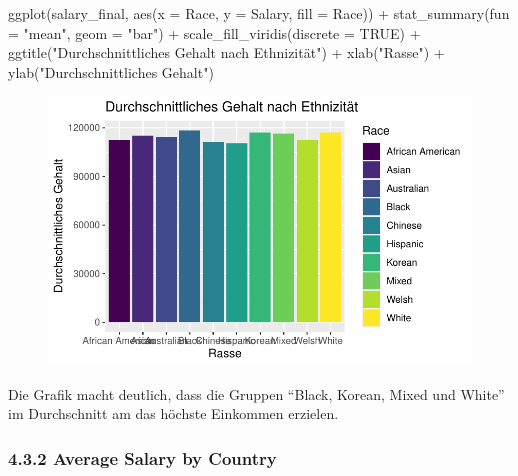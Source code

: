 \documentclass[
  letterpaper,
  DIV=11,
  numbers=noendperiod]{scrartcl}
\newenvironment{Shaded}{\begin{snugshade}}{\end{snugshade}}
\newcommand{\AttributeTok}[1]{\textcolor[rgb]{0.40,0.45,0.13}{#1}}
\newcommand{\ConstantTok}[1]{\textcolor[rgb]{0.56,0.35,0.01}{#1}}
\newcommand{\FunctionTok}[1]{\textcolor[rgb]{0.28,0.35,0.67}{#1}}
\newcommand{\NormalTok}[1]{\textcolor[rgb]{0.00,0.23,0.31}{#1}}
\newcommand{\SpecialCharTok}[1]{\textcolor[rgb]{0.37,0.37,0.37}{#1}}
\newcommand{\StringTok}[1]{\textcolor[rgb]{0.13,0.47,0.30}{#1}}
\begin{document}
\begin{Shaded}
\begin{Highlighting}[]
\FunctionTok{ggplot}\NormalTok{(salary\_final, }\FunctionTok{aes}\NormalTok{(}\AttributeTok{x =}\NormalTok{ Race, }\AttributeTok{y =}\NormalTok{ Salary, }\AttributeTok{fill =}\NormalTok{ Race)) }\SpecialCharTok{+}
  \FunctionTok{stat\_summary}\NormalTok{(}\AttributeTok{fun =} \StringTok{"mean"}\NormalTok{, }\AttributeTok{geom =} \StringTok{"bar"}\NormalTok{) }\SpecialCharTok{+}
  \FunctionTok{scale\_fill\_viridis}\NormalTok{(}\AttributeTok{discrete =} \ConstantTok{TRUE}\NormalTok{) }\SpecialCharTok{+}
  \FunctionTok{ggtitle}\NormalTok{(}\StringTok{"Durchschnittliches Gehalt nach Ethnizität"}\NormalTok{) }\SpecialCharTok{+}
  \FunctionTok{xlab}\NormalTok{(}\StringTok{"Rasse"}\NormalTok{) }\SpecialCharTok{+}
  \FunctionTok{ylab}\NormalTok{(}\StringTok{"Durchschnittliches Gehalt"}\NormalTok{)}
\end{Highlighting}
\end{Shaded}

\begin{figure}[H]

{\centering \includegraphics{main_doc_files/figure-pdf/unnamed-chunk-30-1.pdf}

}

\end{figure}

Die Grafik macht deutlich, dass die Gruppen ``Black, Korean, Mixed und
White'' im Durchschnitt am das höchste Einkommen erzielen.

\hypertarget{average-salary-by-country}{%
\subsubsection{4.3.2 Average Salary by
Country}\label{average-salary-by-country}}
\end{document}
